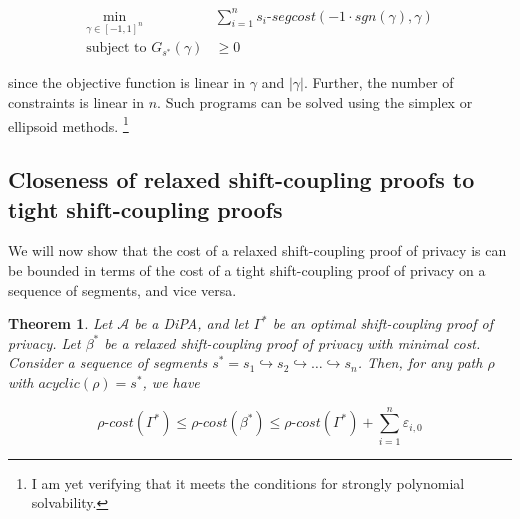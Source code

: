 \documentclass{article}
\newtheorem{theorem}{Theorem}
\renewcommand{\epsilon}{\varepsilon}
\newcommand{\1}{\langle 1 \rangle}
\newcommand{\2}{\langle 2 \rangle}
\begin{document}
\begin{align*}
    \min_{\gamma \in [-1, 1]^n} &\sum_{i = 1}^n s_i\text{-}segcost(-1 \cdot sgn(\gamma), \gamma) \\
    \text{subject to } G_{s^*}(\gamma) &\geq 0
\end{align*}

since the objective function is linear in $\gamma$ and $|\gamma|$. Further, the number of constraints is linear in $n$. Such programs can be solved using the simplex or ellipsoid methods. \footnote{I am yet verifying that it meets the conditions for strongly polynomial solvability.}


\subsection{Closeness of relaxed shift-coupling proofs to tight shift-coupling proofs}

We will now show that the cost of a relaxed shift-coupling proof of privacy is can be bounded in terms of the cost of a tight shift-coupling proof of privacy on a sequence of segments, and vice versa. 

\begin{theorem}
    \label{thm:relaxed_shifts_close}
    Let $\mathcal{A}$ be a DiPA, and let $\Gamma^*$ be an optimal shift-coupling proof of privacy. Let $\beta^*$ be a relaxed shift-coupling proof of privacy with minimal cost. Consider a sequence of segments $s^* = s_1 \hookrightarrow s_2 \hookrightarrow \dots \hookrightarrow s_n$. Then, for any path $\rho$ with $acyclic(\rho) = s^*$, we have

    \[\rho\text{-}cost(\Gamma^*) \leq \rho\text{-}cost(\beta^*) \leq \rho\text{-}cost(\Gamma^*) + \sum_{i = 1}^n \epsilon_{i, 0} \]
\end{theorem}
\end{document}
